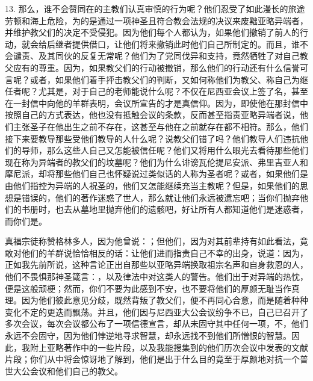 13. 那么，谁不会赞同在的主教们认真审慎的行为呢？他们忍受了如此漫长的旅途劳顿和海上危险，为的是通过一项神圣且符合教会法规的决议来废黜亚略异端者，并维护教父们的决定不受侵犯。因为他们每个人都认为，如果他们撤销了前人的行动，就会给后继者提供借口，让他们将来撤销此时他们自己所制定的。而且，谁不会谴责、及其同伙的反复无常呢？他们为了党同伐异和支持，竟然牺牲了对自己教父应有的尊重。因为，如果教父们的行动被撤销，那么他们的行动还有什么信誉可言呢？或者，如果他们着手抨击教父们的判断，又如何称他们为教父、称自己为继任者呢？尤其是，对于自己的老师能说什么呢？不仅在尼西亚会议上签了名，甚至在一封信中向他的羊群表明，会议所宣告的才是真信仰。因为，即使他在那封信中按照自己的方式表达，他也没有抵触会议的条款，反而甚至指责亚略异端者说，他们主张圣子在他出生之前不存在，这甚至与他在之前就存在都不相符。那么，他们接下来要教导那些受他们教导的人什么呢？说教父们错了吗？他们教导人们违抗他们的导师，那么这些人自己又怎能被信任呢？他们又将用什么眼光去看待那些他们现在称为异端者的教父们的坟墓呢？他们为什么诽谤瓦伦提尼安派、弗里吉亚人和摩尼派，却将那些他们自己也怀疑说过类似话的人称为圣者呢？或者，如果他们是由他们指控为异端的人祝圣的，他们又怎能继续充当主教呢？但是，如果他们的思想是错误的，他们的著作迷惑了世人，那么就让他们永远被遗忘吧；当你们抛弃他们的书册时，也去从墓地里抛弃他们的遗骸吧，好让所有人都知道他们是迷惑者，而你们是。\par

真福宗徒称赞格林多人，因为他曾说：；但他们，因为对其前辈持有如此看法，竟敢对他们的羊群说恰恰相反的话：让他们进而指责自己不幸的出身，说道：因为，正如我先前所说，这种言论正出自那些以亚略异端换取祖宗名声和自身救恩的人，他们不畏惧那神圣箴言：，以及律法中对这类人的警告。他们出于对异端的热忱，便是这般顽梗；然而，你们不要为此感到不安，也不要将他们的厚颜无耻当作真理。因为他们彼此意见分歧，既然背叛了教父们，便不再同心合意，而是随着种种变化不定的更迭而飘荡。并且，他们因与尼西亚大公会议纷争不已，自己已召开了多次会议，每次会议都公布了一项信德宣言，却从未固守其中任何一项，不，他们永远不会固守，因为他们悖逆地寻求智慧，却永远找不到他们所憎恨的智慧。因此，我附上亚略著作中的一些片段，以及我能搜集到的他们历次会议中发表的文献片段；你们从中将会惊讶地了解到，他们是出于什么目的竟至于厚颜地对抗一个普世大公会议和他们自己的教父。\par

